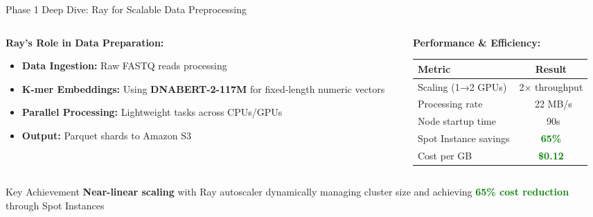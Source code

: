 \documentclass[aspectratio=169]{beamer}
\begin{document}
\begin{frame}{Phase 1 Deep Dive: Ray for Scalable Data Preprocessing}
    \begin{columns}
        \begin{column}{0.5\textwidth}
            \textbf{Ray's Role in Data Preparation:}
            \begin{itemize}
                \item \textbf{Data Ingestion:} Raw FASTQ reads processing
                \item \textbf{K-mer Embeddings:} Using \textcolor{rayblue}{\textbf{DNABERT-2-117M}} for fixed-length numeric vectors
                \item \textbf{Parallel Processing:} Lightweight tasks across CPUs/GPUs
                \item \textbf{Output:} Parquet shards to Amazon S3
            \end{itemize}
        \end{column}
        \begin{column}{0.5\textwidth}
            \textbf{Performance \& Efficiency:}
            \begin{table}[h]
                \centering
                \small
                \begin{tabular}{lc}
                    \toprule
                    \textbf{Metric} & \textbf{Result} \\
                    \midrule
                    Scaling (1→2 GPUs) & 2× throughput \\
                    Processing rate & ~22 MB/s \\
                    Node startup time & ~90s \\
                    Spot Instance savings & \textcolor{green}{\textbf{65\%}} \\
                    Cost per GB & \textcolor{green}{\textbf{\$0.12}} \\
                    \bottomrule
                \end{tabular}
            \end{table}
        \end{column}
    \end{columns}
    
    \vspace{0.3cm}
    \begin{alertblock}{Key Achievement}
        \textbf{Near-linear scaling} with Ray autoscaler dynamically managing cluster size and achieving \textcolor{green}{\textbf{65\% cost reduction}} through Spot Instances
    \end{alertblock}
\end{frame}
\end{document}
